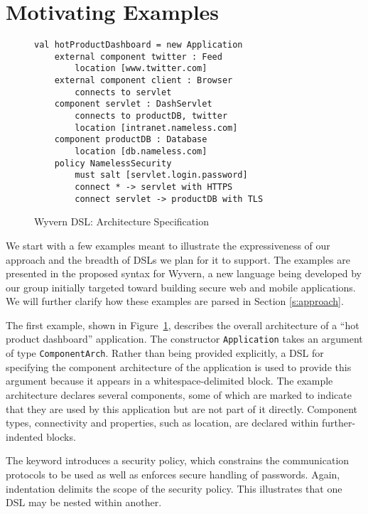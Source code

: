 \section{Motivating Examples}
\label{s:motivation}

\begin{figure}
  \centering
  \begin{lstlisting}
val hotProductDashboard = new Application
    external component twitter : Feed
        location [www.twitter.com]
    external component client : Browser
        connects to servlet
    component servlet : DashServlet
        connects to productDB, twitter
        location [intranet.nameless.com]
    component productDB : Database
        location [db.nameless.com]
    policy NamelessSecurity
        must salt [servlet.login.password]
        connect * -> servlet with HTTPS
        connect servlet -> productDB with TLS
  \end{lstlisting}
  \caption{Wyvern DSL: Architecture Specification}
  \label{f:dsl-arch}
\end{figure}

We start with a few examples meant to illustrate the expressiveness of our approach and the breadth of DSLs we plan for it to support.  The examples are presented in the proposed syntax for Wyvern, a new language being developed by our group  initially targeted toward building secure web and mobile applications. We will further clarify how these examples are parsed in Section \ref{s:approach}.

The first example, shown in Figure~\ref{f:dsl-arch}, describes the overall architecture of a ``hot product dashboard'' application.  The constructor \verb|Application| takes an argument of type \verb|ComponentArch|. Rather than being provided explicitly, a DSL for specifying the component architecture of the application is used to provide this argument because it appears in a whitespace-delimited block. The example architecture declares several components, some of which are marked  to indicate that they are used by this application but are not part of it directly. Component types, connectivity and properties, such as location, are declared within further-indented blocks.

The  keyword introduces a security policy, which constrains the communication protocols to be used as well as
enforces secure handling of passwords.  Again, indentation delimits
the scope of the security policy.  This
illustrates that one DSL may be nested within another.

